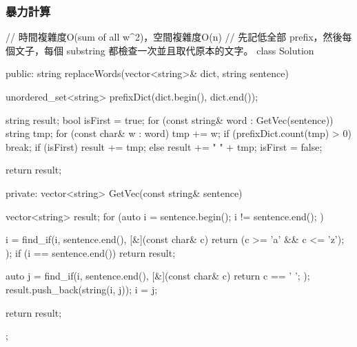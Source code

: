 \subsubsection{暴力計算}
\begin{Code}
// 時間複雜度O(sum of all w^2)，空間複雜度O(n)
// 先記低全部 prefix，然後每個文子，每個 substring 都檢查一次並且取代原本的文字。
class Solution {
public:
    string replaceWords(vector<string>& dict, string sentence) {
        unordered_set<string> prefixDict(dict.begin(), dict.end());

        string result;
        bool isFirst = true;
        for (const string& word : GetVec(sentence))
        {
            string tmp;
            for (const char& w : word)
            {
                tmp += w;
                if (prefixDict.count(tmp) > 0)
                    break;
            }
            if (isFirst)
                result += tmp;
            else
                result += " " + tmp;
            isFirst = false;
        }

        return result;
    }
private:
    vector<string> GetVec(const string& sentence)
    {
        vector<string> result;
        for (auto i = sentence.begin(); i != sentence.end(); )
        {
            i = find_if(i, sentence.end(), [&](const char& c){ return (c >= 'a' && c <= 'z'); });
            if (i == sentence.end()) return result;

            auto j = find_if(i, sentence.end(), [&](const char& c){ return c == ' '; });
            result.push_back(string(i, j));
            i = j;
        }
        return result;
    }
};
\end{Code}

